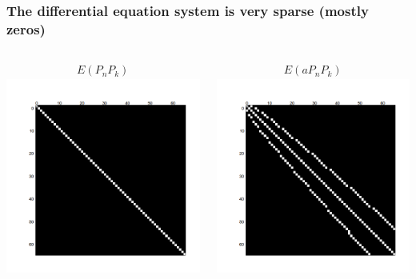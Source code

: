 \documentclass{beamer}
\begin{document}
\begin{frame}
 \frametitle{The differential equation system is very sparse (mostly zeros)}
 \begin{columns}
\begin{center}
    \begin{align*}
        E(P_nP_k)
    \end{align*}
  \includegraphics[width=\textwidth]{binary_matrix1.png}
\end{center}
     \begin{center}
    \begin{align*}
        E(aP_nP_k)
    \end{align*}
  \includegraphics[width=\textwidth]{binary_matrix.png}

\end{center}
\end{columns}
\end{frame}
\end{document}
